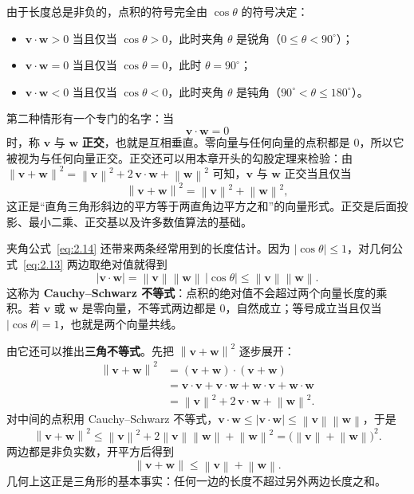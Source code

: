 \documentclass[UTF8,a4paper,12pt]{ctexart}
\numberwithin{equation}{section}
\newcommand{\norm}[1]{\left\lVert #1 \right\rVert}
\begin{document}
	由于长度总是非负的，点积的符号完全由 $\cos\theta$ 的符号决定：
	\begin{itemize}
		\item $\bm{v}\cdot\bm{w}>0$ 当且仅当 $\cos\theta>0$，此时夹角 $\theta$ 是锐角（$0\le\theta<90^\circ$）；
		\item $\bm{v}\cdot\bm{w}=0$ 当且仅当 $\cos\theta=0$，此时 $\theta=90^\circ$；
		\item $\bm{v}\cdot\bm{w}<0$ 当且仅当 $\cos\theta<0$，此时夹角 $\theta$ 是钝角（$90^\circ<\theta\le 180^\circ$）。
	\end{itemize}

	第二种情形有一个专门的名字：当
	\begin{equation}\label{eq:2.17}
	\bm{v}\cdot\bm{w}=0
	\end{equation}
	时，称 $\bm{v}$ 与 $\bm{w}$ \textbf{正交}，也就是互相垂直。零向量与任何向量的点积都是 $0$，所以它被视为与任何向量正交。正交还可以用本章开头的勾股定理来检验：由 $\norm{\bm{v}+\bm{w}}^2=\norm{\bm{v}}^2+2\,\bm{v}\cdot\bm{w}+\norm{\bm{w}}^2$ 可知，$\bm{v}$ 与 $\bm{w}$ 正交当且仅当
	\begin{equation}\label{eq:2.18}
	\norm{\bm{v}+\bm{w}}^2=\norm{\bm{v}}^2+\norm{\bm{w}}^2,
	\end{equation}
	这正是“直角三角形斜边的平方等于两直角边平方之和”的向量形式。正交是后面投影、最小二乘、正交基以及许多数值算法的基础。

夹角公式~\eqref{eq:2.14} 还带来两条经常用到的长度估计。因为 $|\cos\theta|\le 1$，对几何公式~\eqref{eq:2.13} 两边取绝对值就得到
	\begin{equation}\label{eq:2.19}
	|\bm{v}\cdot\bm{w}|=\norm{\bm{v}}\norm{\bm{w}}\,|\cos\theta|\le\norm{\bm{v}}\norm{\bm{w}}.
	\end{equation}
	这称为 \textbf{Cauchy--Schwarz 不等式}：点积的绝对值不会超过两个向量长度的乘积。若 $\bm{v}$ 或 $\bm{w}$ 是零向量，不等式两边都是 $0$，自然成立；等号成立当且仅当 $|\cos\theta|=1$，也就是两个向量共线。

	由它还可以推出\textbf{三角不等式}。先把 $\norm{\bm{v}+\bm{w}}^2$ 逐步展开：
	\begin{equation}\label{eq:2.20}
	\begin{aligned}
	\norm{\bm{v}+\bm{w}}^2
	&=(\bm{v}+\bm{w})\cdot(\bm{v}+\bm{w})\\
	&=\bm{v}\cdot\bm{v}+\bm{v}\cdot\bm{w}+\bm{w}\cdot\bm{v}+\bm{w}\cdot\bm{w}\\
	&=\norm{\bm{v}}^2+2\,\bm{v}\cdot\bm{w}+\norm{\bm{w}}^2.
	\end{aligned}
	\end{equation}
	对中间的点积用 Cauchy--Schwarz 不等式，$\bm{v}\cdot\bm{w}\le|\bm{v}\cdot\bm{w}|\le\norm{\bm{v}}\norm{\bm{w}}$，于是
	\begin{equation}\label{eq:2.21}
	\norm{\bm{v}+\bm{w}}^2
	\le\norm{\bm{v}}^2+2\norm{\bm{v}}\norm{\bm{w}}+\norm{\bm{w}}^2
	=\bigl(\norm{\bm{v}}+\norm{\bm{w}}\bigr)^2.
	\end{equation}
	两边都是非负实数，开平方后得到
	\begin{equation}\label{eq:2.22}
	\norm{\bm{v}+\bm{w}}\le\norm{\bm{v}}+\norm{\bm{w}}.
	\end{equation}
	几何上这正是三角形的基本事实：任何一边的长度不超过另外两边长度之和。
\end{document}
